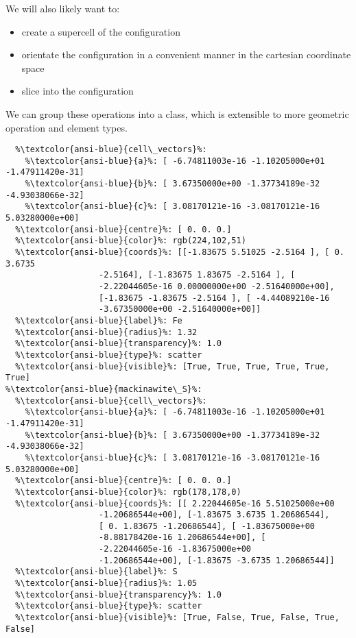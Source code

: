 \documentclass[10pt,parskip=half,
	toc=sectionentrywithdots,
	bibliography=totocnumbered,
	captions=tableheading,numbers=noendperiod]{scrartcl}
\providecommand{\tightlist}{%
  \setlength{\itemsep}{0pt}\setlength{\parskip}{0pt}}
\begin{document}
We will also likely want to:

\begin{itemize}
\tightlist
\item
  create a supercell of the configuration
\item
  orientate the configuration in a convenient manner in the cartesian
  coordinate space
\item
  slice into the configuration
\end{itemize}

We can group these operations into a class, which is extensible to more
geometric operation and element types.

\begin{lstlisting}[language={},postbreak={},numbers=none,xrightmargin=7pt,belowskip=5pt,aboveskip=5pt,breakindent=0pt,escapechar=\%]
%\textcolor{ansi-blue}{mackinawite\_Fe}%: 
  %\textcolor{ansi-blue}{cell\_vectors}%: 
    %\textcolor{ansi-blue}{a}%: [ -6.74811003e-16 -1.10205000e+01 -1.47911420e-31]
    %\textcolor{ansi-blue}{b}%: [ 3.67350000e+00 -1.37734189e-32 -4.93038066e-32]
    %\textcolor{ansi-blue}{c}%: [ 3.08170121e-16 -3.08170121e-16 5.03280000e+00]
  %\textcolor{ansi-blue}{centre}%: [ 0. 0. 0.]
  %\textcolor{ansi-blue}{color}%: rgb(224,102,51)
  %\textcolor{ansi-blue}{coords}%: [[-1.83675 5.51025 -2.5164 ], [ 0. 3.6735 
                   -2.5164], [-1.83675 1.83675 -2.5164 ], [ 
                   -2.22044605e-16 0.00000000e+00 -2.51640000e+00], 
                   [-1.83675 -1.83675 -2.5164 ], [ -4.44089210e-16 
                   -3.67350000e+00 -2.51640000e+00]]
  %\textcolor{ansi-blue}{label}%: Fe
  %\textcolor{ansi-blue}{radius}%: 1.32
  %\textcolor{ansi-blue}{transparency}%: 1.0
  %\textcolor{ansi-blue}{type}%: scatter
  %\textcolor{ansi-blue}{visible}%: [True, True, True, True, True, True]
%\textcolor{ansi-blue}{mackinawite\_S}%: 
  %\textcolor{ansi-blue}{cell\_vectors}%: 
    %\textcolor{ansi-blue}{a}%: [ -6.74811003e-16 -1.10205000e+01 -1.47911420e-31]
    %\textcolor{ansi-blue}{b}%: [ 3.67350000e+00 -1.37734189e-32 -4.93038066e-32]
    %\textcolor{ansi-blue}{c}%: [ 3.08170121e-16 -3.08170121e-16 5.03280000e+00]
  %\textcolor{ansi-blue}{centre}%: [ 0. 0. 0.]
  %\textcolor{ansi-blue}{color}%: rgb(178,178,0)
  %\textcolor{ansi-blue}{coords}%: [[ 2.22044605e-16 5.51025000e+00 
                   -1.20686544e+00], [-1.83675 3.6735 1.20686544], 
                   [ 0. 1.83675 -1.20686544], [ -1.83675000e+00 
                   -8.88178420e-16 1.20686544e+00], [ 
                   -2.22044605e-16 -1.83675000e+00 
                   -1.20686544e+00], [-1.83675 -3.6735 1.20686544]]
  %\textcolor{ansi-blue}{label}%: S
  %\textcolor{ansi-blue}{radius}%: 1.05
  %\textcolor{ansi-blue}{transparency}%: 1.0
  %\textcolor{ansi-blue}{type}%: scatter
  %\textcolor{ansi-blue}{visible}%: [True, False, True, False, True, False]

\end{lstlisting}
\end{document}
